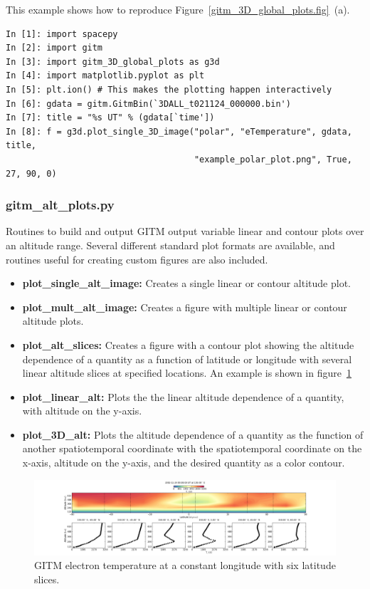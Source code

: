 This example shows how to reproduce Figure~\ref{gitm_3D_global_plots.fig}~(a).

\begin{verbatim}
In [1]: import spacepy
In [2]: import gitm
In [3]: import gitm_3D_global_plots as g3d
In [4]: import matplotlib.pyplot as plt
In [5]: plt.ion() # This makes the plotting happen interactively
In [6]: gdata = gitm.GitmBin(`3DALL_t021124_000000.bin')
In [7]: title = "%s UT" % (gdata[`time'])
In [8]: f = g3d.plot_single_3D_image("polar", "eTemperature", gdata, title, 
                                     "example_polar_plot.png", True, 27, 90, 0)
\end{verbatim}

\subsubsection{gitm\_alt\_plots.py}

Routines to build and output GITM output variable linear and contour plots over an altitude range.  Several different standard plot formats are available, and routines useful for creating custom figures are also included.

\begin{itemize}
\item[]{{\bf plot\_single\_alt\_image:}  Creates a single linear or contour altitude plot.}
\item[]{{\bf plot\_mult\_alt\_image:}  Creates a figure with multiple linear or contour altitude plots.}
\item[]{{\bf plot\_alt\_slices:}  Creates a figure with a contour plot showing the altitude dependence of a quantity as a function of latitude or longitude with several linear altitude slices at specified locations.  An example is shown in figure~\ref{gitm_alt_slices.fig}}
\item[]{{\bf plot\_linear\_alt:}  Plots the the linear altitude dependence of a quantity, with altitude on the y-axis.}
\item[]{{\bf plot\_3D\_alt:}  Plots the altitude dependence of a quantity as the function of another spatiotemporal coordinate with the spatiotemporal coordinate on the x-axis, altitude on the y-axis, and the desired quantity as a color contour.}
\end{itemize}

\begin{figure}
\begin{center}
\noindent\includegraphics[width=\textwidth]{Figures/gitm_alt_slice_test_Te.png}
\caption{GITM electron temperature at a constant longitude with six latitude slices.}
\label{gitm_alt_slices.fig}
\end{center}
\end{figure}

